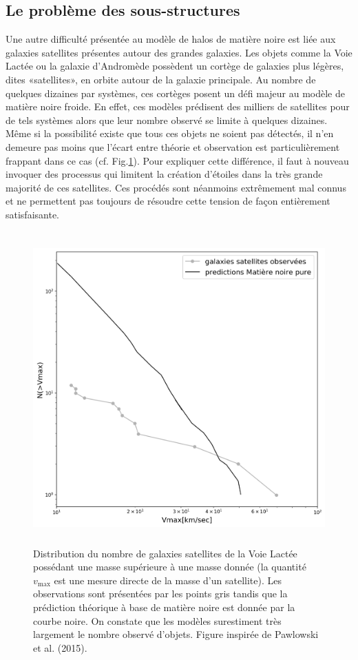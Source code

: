 \subsection{Le problème des sous-structures}
Une autre difficulté présentée au modèle de halos de matière noire est liée aux galaxies satellites présentes autour des grandes galaxies. Les objets comme la Voie Lactée ou la galaxie d'Andromède possèdent un cortège de galaxies plus légères, dites «satellites», en orbite autour de la galaxie principale. Au nombre de quelques dizaines par systèmes, ces cortèges posent un défi majeur au modèle de matière noire froide. En effet, ces modèles  prédisent des milliers de satellites pour de tels systèmes alors que leur nombre observé se limite à quelques dizaines. Même si la possibilité existe que tous ces objets ne soient pas détectés, il n'en demeure pas moins que l'écart entre théorie et observation est particulièrement frappant dans ce cas (cf. Fig.\ref{f:missing}). Pour expliquer cette différence, il faut à nouveau invoquer des processus qui limitent la création d'étoiles dans la très grande majorité de ces satellites. Ces procédés sont néanmoins extrêmement mal connus et ne permettent pas toujours de résoudre cette tension de façon entièrement satisfaisante.
\begin{figure}[htbp]
	\centering
		\includegraphics[height=12cm]{figs/missing.png}
	\caption[Distribution du nombre de galaxies satellites de la Voie Lactée]{Distribution du nombre de galaxies satellites de la Voie Lactée possédant une masse supérieure à une masse donnée (la quantité $v_\mathrm{max}$ est une mesure directe de la masse d'un satellite). Les observations sont présentées par les points gris tandis que la prédiction théorique à base de matière noire est donnée par la courbe noire. On constate que les modèles surestiment très largement le nombre observé d'objets. Figure inspirée de Pawlowski et al. (2015). } 
	\label{f:missing}
\end{figure}

